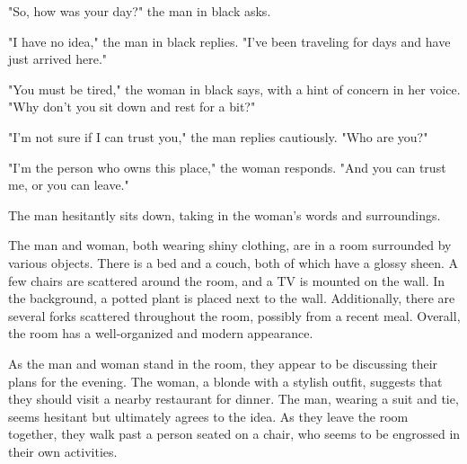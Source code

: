 \documentclass[smalldemyvopaper,11pt,twoside,onecolumn,openright,extrafontsizes]{memoir}
\begin{document}
"So, how was your day?" the man in black asks.\par
"I have no idea," the man in black replies. "I've been traveling for days and have just arrived here."\par
"You must be tired," the woman in black says, with a hint of concern in her voice. "Why don't you sit down and rest for a bit?"\par
"I'm not sure if I can trust you," the man replies cautiously. "Who are you?"\par
"I'm the person who owns this place," the woman responds. "And you can trust me, or you can leave."\par
The man hesitantly sits down, taking in the woman's words and surroundings.\par
The man and woman, both wearing shiny clothing, are in a room surrounded by various objects. There is a bed and a couch, both of which have a glossy sheen. A few chairs are scattered around the room, and a TV is mounted on the wall. In the background, a potted plant is placed next to the wall. Additionally, there are several forks scattered throughout the room, possibly from a recent meal. Overall, the room has a well-organized and modern appearance.\par
As the man and woman stand in the room, they appear to be discussing their plans for the evening. The woman, a blonde with a stylish outfit, suggests that they should visit a nearby restaurant for dinner. The man, wearing a suit and tie, seems hesitant but ultimately agrees to the idea. As they leave the room together, they walk past a person seated on a chair, who seems to be engrossed in their own activities.\par
\end{document}
